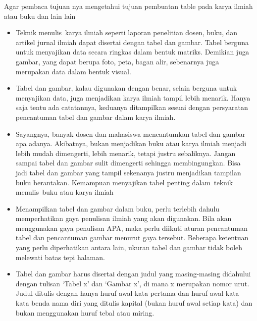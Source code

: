 \vspace{\baselineskip}

Agar pembaca tujuan nya mengetahui tujuan pembuatan table pada karya ilmiah atau buku dan lain lain\par

\vspace{\baselineskip}

\begin{itemize}
	\item Teknik menulis karya ilmiah seperti laporan penelitian dosen, buku, dan artikel jurnal ilmiah dapat disertai dengan tabel dan gambar. Tabel berguna untuk menyajikan data secara ringkas dalam bentuk matriks. Demikian juga gambar, yang dapat berupa foto, peta, bagan alir, sebenarnya juga merupakan data dalam bentuk visual.\par

\vspace{\baselineskip}
	\item Tabel dan gambar, kalau digunakan dengan benar, selain berguna untuk menyajikan data, juga menjadikan karya ilmiah tampil lebih menarik. Hanya saja tentu ada catatannya, keduanya ditampilkan sesuai dengan persyaratan pencantuman tabel dan gambar dalam karya ilmiah.\par

\vspace{\baselineskip}
	\item Sayangnya, banyak dosen dan mahasiswa mencantumkan tabel dan gambar apa adanya. Akibatnya, bukan menjadikan buku atau karya ilmiah menjadi lebih mudah dimengerti, lebih menarik, tetapi justru sebaliknya. Jangan sampai tabel dan gambar sulit dimengerti sehingga membingungkan. Bisa jadi tabel dan gambar yang tampil sekenanya justru menjadikan tampilan buku berantakan. Kemampuan menyajikan tabel penting dalam teknik menulis buku atau karya ilmiah\par

\vspace{\baselineskip}
	\item Menampilkan tabel dan gambar dalam buku, perlu terlebih dahulu memperhatikan gaya penulisan ilmiah yang akan digunakan. Bila akan menggunakan gaya penulisan APA, maka perlu diikuti aturan pencantuman tabel dan pencantuman gambar menurut gaya tersebut. Beberapa ketentuan yang perlu diperhatikan antara lain, ukuran tabel dan gambar tidak boleh melewati batas tepi halaman.\par

\vspace{\baselineskip}
	\item Tabel dan gambar harus disertai dengan judul yang masing-masing didahului dengan tulisan ‘Tabel x’ dan ‘Gambar x’, di mana x merupakan nomor urut. Judul ditulis dengan hanya huruf awal kata pertama dan huruf awal kata-kata benda nama diri yang ditulis kapital (bukan huruf awal setiap kata) dan bukan menggunakan huruf tebal atau miring.\par


\end{itemize}

